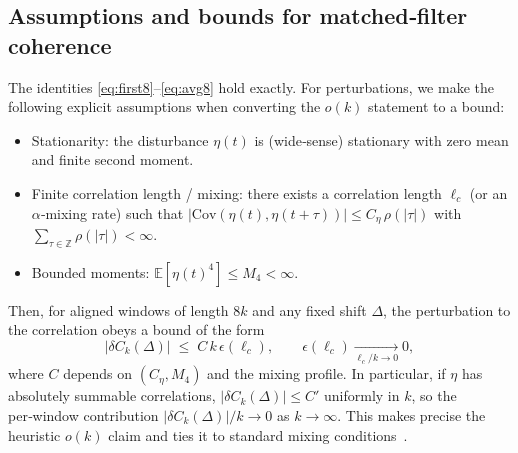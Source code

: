 \documentclass[12pt,a4paper]{article}
\theoremstyle{definition}
\theoremstyle{remark}
\begin{document}
\subsection*{Assumptions and bounds for matched‑filter coherence}
The identities \eqref{eq:first8}–\eqref{eq:avg8} hold exactly. For perturbations, we make the following explicit assumptions when converting the $o(k)$ statement to a bound:
\begin{itemize}
\item Stationarity: the disturbance $\eta(t)$ is (wide‑sense) stationary with zero mean and finite second moment.
\item Finite correlation length / mixing: there exists a correlation length $\ell_c$ (or an $\alpha$‑mixing rate) such that $|\mathrm{Cov}(\eta(t),\eta(t+\tau))|\le C_\eta\,\rho(|\tau|)$ with $\sum_{\tau\in\mathbb{Z}} \rho(|\tau|)<\infty$.
\item Bounded moments: $\mathbb{E}[\eta(t)^4]\le M_4<\infty$.
\end{itemize}
Then, for aligned windows of length $8k$ and any fixed shift $\Delta$, the perturbation to the correlation obeys a bound of the form
\[
 |\delta C_k(\Delta)|\;\le\; C\,k\,\epsilon(\ell_c),\qquad \epsilon(\ell_c)\xrightarrow[\ell_c/k\to 0]{} 0,
\]
where $C$ depends on $(C_\eta,M_4)$ and the mixing profile. In particular, if $\eta$ has absolutely summable correlations, $|\delta C_k(\Delta)|\le C'$ uniformly in $k$, so the per‑window contribution $|\delta C_k(\Delta)|/k\to 0$ as $k\to\infty$. This makes precise the heuristic $o(k)$ claim and ties it to standard mixing conditions~\cite{Rosenblatt1956,Bradley2005}.
\end{document}
